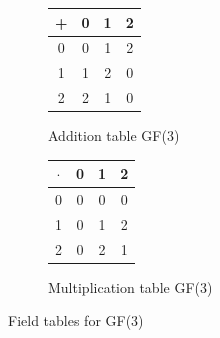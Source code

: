 \documentclass[11pt, oneside]{article} 	%
\begin{document}
\begin{figure}[!htb]
\centering
\begin{subfigure}{.3\textwidth}
 \centering
 \begin{tabular}{c | c c c}
 + & 0 & 1 & 2 \\
\hline
 0 & 0 & 1 & 2 \\
 1 & 1 & 2 & 0 \\
 2 & 2 & 1 & 0 \\
 \end{tabular}
 \caption{Addition table GF(3)}
\label{fig:gf3-add}
\end{subfigure}
\begin{subfigure}{.3\textwidth}
 \centering
\begin{tabular}{c | c c c}
 $\cdot$ & 0 & 1 & 2 \\
\hline
 0 & 0 & 0 & 0 \\
 1 & 0 & 1 & 2 \\
 2 & 0 & 2 & 1 \\

\end{tabular}
\caption{Multiplication table GF(3)}
\label{fig:gf3-mult}
\end{subfigure}
\caption{Field tables for GF(3)}
\label{fig:gf3-tables}
\end{figure}
\end{document}
